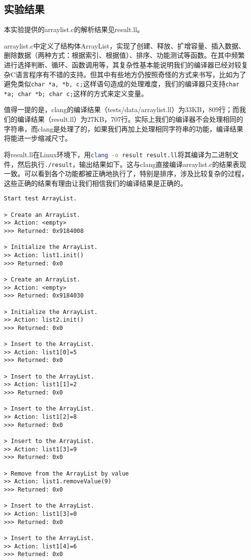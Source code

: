\documentclass[a4paper]{article}
\begin{document}
\begin{CJK*}{UTF8}{gbsn}
    \section{实验结果}
    本实验提供的arraylist.c的解析结果见result.ll。
    \par arraylist.c中定义了结构体ArrayList，实现了创建、释放、扩增容量、插入数据、删除数据（两种方式：根据索引、根据值）、排序、功能测试等函数。在其中频繁进行选择判断、循环、函数调用等，其复杂性基本能说明我们的编译器已经对较复杂C语言程序有不错的支持。但其中有些地方仍按照奇怪的方式来书写，比如为了避免类似\lstinline{char *a, *b, c;}这样语句造成的处理难度，我们的编译器只支持\lstinline{char *a; char *b; char c;}这样的方式来定义变量。
    \par 值得一提的是，clang的编译结果（tests/data/arraylist.ll）为33KB，809行；而我们的编译结果（result.ll）为27KB，707行。实际上我们的编译器不会处理相同的字符串，而clang是处理了的，如果我们再加上处理相同字符串的功能，编译结果将能进一步缩减尺寸。
    \par 将result.ll在Linux环境下，用\lstinline[language=sh]{clang -o result result.ll}将其编译为二进制文件，然后执行\lstinline[language=sh]{./result}，输出结果如下。这与clang直接编译arraylist.c的结果表现一致。可以看到各个功能都被正确地执行了，特别是排序，涉及比较复杂的过程，这些正确的结果有理由让我们相信我们的编译结果是正确的。
    \begin{verbatim}
Start test ArrayList.

> Create an ArrayList.
>> Action: <empty>
>>> Returned: 0x9184008

> Initialize the ArrayList.
>> Action: list1.init()
>>> Returned: 0x0

> Create an ArrayList.
>> Action: <empty>
>>> Returned: 0x9184030

> Initialize the ArrayList.
>> Action: list2.init()
>>> Returned: 0x0

> Insert to the ArrayList.
>> Action: list1[0]=5
>>> Returned: 0x0

> Insert to the ArrayList.
>> Action: list1[1]=2
>>> Returned: 0x0

> Insert to the ArrayList.
>> Action: list1[2]=8
>>> Returned: 0x0

> Insert to the ArrayList.
>> Action: list1[3]=9
>>> Returned: 0x0

> Remove from the ArrayList by value
>> Action: list1.removeValue(9)
>>> Returned: 0x0

> Insert to the ArrayList.
>> Action: list1[3]=0
>>> Returned: 0x0

> Insert to the ArrayList.
>> Action: list1[4]=6
>>> Returned: 0x0


\end{verbatim}
\end{CJK*}
\end{document}
